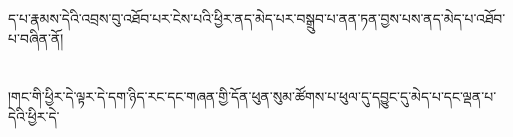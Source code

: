ད་པ་རྣམས་དེའི་འབྲས་བུ་འཐོབ་པར་ངེས་པའི་ཕྱིར་ནད་མེད་པར་བསྒྲུབ་པ་ནན་ཏན་བྱས་པས་ནད་མེད་པ་འཐོབ་པ་བཞིན་ནོ།\chapter{ }།གང་གི་ཕྱིར་དེ་ལྟར་དེ་དག་ཉིད་རང་དང་གཞན་གྱི་དོན་ཕུན་སུམ་ཚོགས་པ་ཕུལ་དུ་དབྱུང་དུ་མེད་པ་དང་ལྡན་པ་དེའི་ཕྱིར་དེ་
